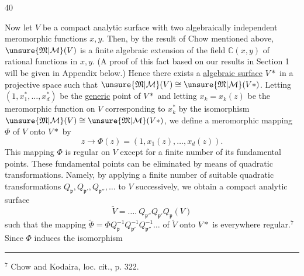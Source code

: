 \begin{center}40\end{center}
Now let $V$ be a compact analytic surface with two algebraically independent meromorphic functions $x,y$. Then, by the result of Chow mentioned above, $\unsure{\mathfrak M|\mathcal M}(V)$ is a finite algebraic extension of the field $\mathbb C(x,y)$ of rational functions in $x,y$. (A proof of this fact based on our results in Section 1 will be given in Appendix below.) Hence there exists a  \uline{algebraic surface} $V*$ in a projective space such that $\unsure{\mathfrak M|\mathcal M}(V)\cong\unsure{\mathfrak M|\mathcal M}(V*)$. Letting $(1,x_1^*,\ldots,x_d^*)$ be the \uline{generic} point of $V*$ and letting $x_k=x_k(z)$ be the meromorphic function on $V$ corresponding to $x_k^*$ by the isomorphism $\unsure{\mathfrak M|\mathcal M}(V)\cong\unsure{\mathfrak M|\mathcal M}(V*)$, we define a meromorphic mapping $\Phi$ of $V$ onto $V*$ by
\[
z\longrightarrow\Phi(z)=(1,x_1(z),\ldots,x_d(z)).
\]
This mapping $\Phi$ is regular on $V$ except for a finite number of its fundamental points. These fundamental points can be eliminated by means of quadratic transformations. Namely, by applying a finite number of suitable quadratic transformations $Q_{\mathfrak p},Q_{\mathfrak p'},Q_{\mathfrak p''},\ldots$ to $V$ successively, we obtain a compact analytic surface
\[
\widetilde V=\ldots.\ Q_{\mathfrak p''}Q_{\mathfrak p'}Q_{\mathfrak p}(V)
\]
such that the mapping $\widetilde\Phi=\Phi Q_{\mathfrak p}^{-1}Q_{\mathfrak p'}^{-1}Q_{\mathfrak p''}^{-1}\ldots$ of $\widetilde V$ onto $V*$ is everywhere regular.$^7$ Since $\Phi$ induces the isomorphism

\noindent\rule{.28\linewidth}{.4pt}

${}^7$ Chow and Kodaira, loc. cit., p. 322.

